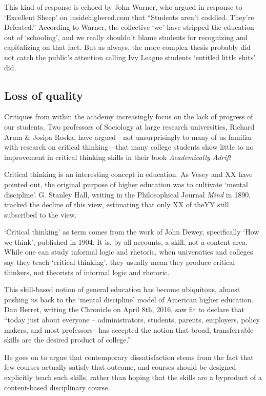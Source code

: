This kind of response is echoed by John Warner, who argued in response to `Excellent Sheep' on insidehighered.com that ``Students aren't coddled. They're Defeated.'' According to Warner, the collective `we' have stripped the education out of `schooling', and we really shouldn't blame students for recognizing and capitalizing on that fact. But as always, the more complex thesis probably did not catch the public's attention calling Ivy League students `entitled little shits' did.

\subsection{Loss of quality}
\label{lossofquality}

Critiques from within the academy increasingly focus on the lack of progress of our students. Two professors of Sociology at large research universities, Richard Arum \& Josipa Roska, have argued---not unsurprisingly to many of us familiar with research on critical thinking---that many college students show little to no improvement in critical thinking skills in their book \emph{Academically Adrift} ~\citep{Arum:2011vt}

Critical thinking is an interesting concept in education. As Vesey and XX have pointed out, the original purpose of higher education was to cultivate `mental discipline'. G. Stanley Hall, writing in the Philosophical Journal \emph{Mind} in 1890, tracked the decline of this view, estimating that only XX of theYY still subscribed to the view.

`Critical thinking' as term comes from the work of John Dewey, specifically `How we think', published in 1904. It is, by all accounts, a skill, not a content area. While one can study informal logic and rhetoric, when universities and colleges say they teach `critical thinking', they usually mean they produce critical thinkers, not theorists of informal logic and rhetoric.

This skill-based notion of general education has become ubiquitous, almost pushing us back to the `mental discipline' model of American higher education.
Dan Berret, writing the Chronicle on April 8th, 2016, saw fit to declare that ``today just about everyone -- administrators, students, parents, employers, policy makers, and most professors-- has accepted the notion that broad, transferrable skills are the desired product of college.'' 

He goes on to argue that contemporary dissatisfaction stems from the fact that few courses actually satisfy that outcome, and courses should be designed explicitly teach such skills, rather than hoping that the skills are a byproduct of a content-based disciplinary course.

